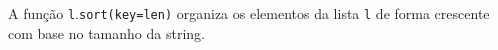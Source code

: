 \documentclass[12pt,varwidth=16cm,border=1pt]{standalone}
\begin{document}
A função \verb+l+.\verb+sort(key=len)+ organiza os elementos da lista \verb+l+ de forma crescente com base no tamanho da string.

\questiomtrue
\end{document}
